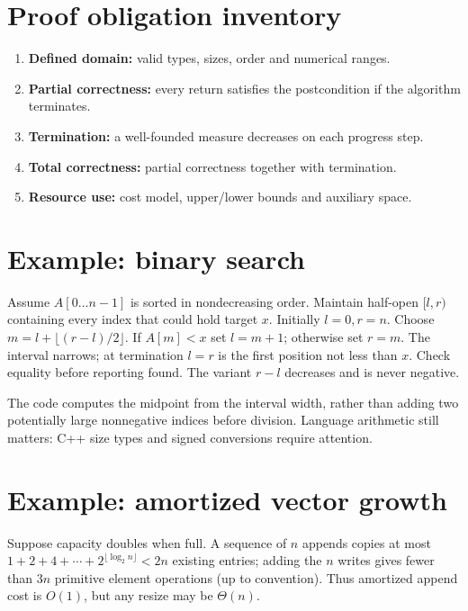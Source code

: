 \documentclass[11pt,letterpaper]{article}
\begin{document}
\tableofcontents
\clearpage
{}
\section{Proof obligation inventory}
\begin{enumerate}\item \textbf{Defined domain:} valid types, sizes, order and numerical ranges.
\item \textbf{Partial correctness:} every return satisfies the postcondition if the algorithm terminates.
\item \textbf{Termination:} a well-founded measure decreases on each progress step.
\item \textbf{Total correctness:} partial correctness together with termination.
\item \textbf{Resource use:} cost model, upper/lower bounds and auxiliary space.
\end{enumerate}
\section{Example: binary search}
Assume $A[0\ldots n-1]$ is sorted in nondecreasing order. Maintain half-open $[l,r)$ containing every index that could hold target $x$. Initially $l=0,r=n$. Choose $m=l+\lfloor (r-l)/2\rfloor$. If $A[m]<x$ set $l=m+1$; otherwise set $r=m$. The interval narrows; at termination $l=r$ is the first position not less than $x$. Check equality before reporting found. The variant $r-l$ decreases and is never negative.
\begin{engineeringnote}[title=Implementation warning]
The code computes the midpoint from the interval width, rather than adding two potentially large nonnegative indices before division. Language arithmetic still matters: C++ size types and signed conversions require attention.
\end{engineeringnote}
\section{Example: amortized vector growth}
Suppose capacity doubles when full. A sequence of $n$ appends copies at most $1+2+4+\cdots+2^{\lfloor\log_2 n\rfloor}<2n$ existing entries; adding the $n$ writes gives fewer than $3n$ primitive element operations (up to convention). Thus amortized append cost is $O(1)$, but any resize may be $\Theta(n)$.
\end{document}
